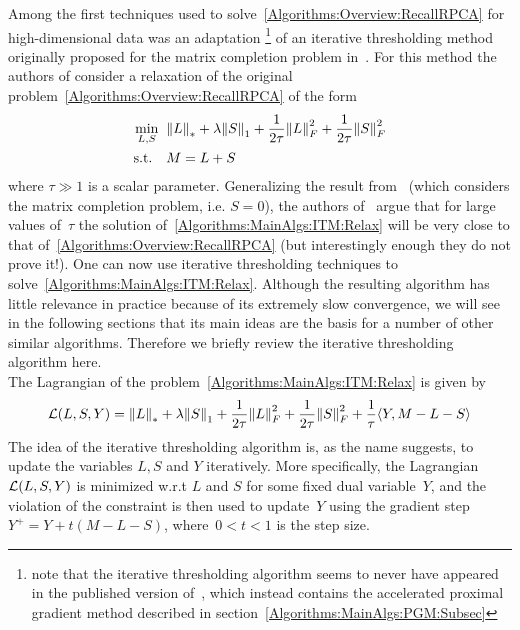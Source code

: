 \documentclass{../../common/projectreport}
\begin{document}
Among the first techniques used to solve~\eqref{Algorithms:Overview:RecallRPCA} for high-dimensional data was an adaptation \cite{Wright:2009fk}\footnote{note that the iterative thresholding algorithm seems to never have appeared in the published version of~\cite{Wright:2009fk}, which instead contains the accelerated proximal gradient method described in section~\ref{Algorithms:MainAlgs:PGM:Subsec}} of an iterative thresholding method originally proposed for the matrix completion problem in~\cite{Cai:2010uq}. For this method the authors of consider a relaxation of the original problem~\eqref{Algorithms:Overview:RecallRPCA} of the form 
%
\begin{align}
\begin{split}
\min_{L,S} \;\; &{\left\|L\right\|}_{*}^{} + \lambda {\left\|S\right\|}_{1}^{} + \frac{1}{2\tau} {\left\|L\right\|}_{F}^{2} + \frac{1}{2\tau} {\left\|S\right\|}_{F}^{2} \\
\text{s.t.} \quad &M=L+S
\end{split}
\label{Algorithms:MainAlgs:ITM:Relax}
\end{align}
%
where $\tau \gg 1$ is a scalar parameter. Generalizing the result from~\cite{Cai:2010uq} (which considers the matrix completion problem, i.e. $S=0$), the authors of~\cite{Wright:2009fk} argue that for large values of~$\tau$ the solution of~\eqref{Algorithms:MainAlgs:ITM:Relax} will be very close to that of~\eqref{Algorithms:Overview:RecallRPCA} (but interestingly enough they do not prove it!). One can now use iterative thresholding techniques to solve~\eqref{Algorithms:MainAlgs:ITM:Relax}. Although the resulting algorithm has little relevance in practice because of its extremely slow convergence, we will see in the following sections that its main ideas are the basis for a number of other similar algorithms. Therefore we briefly review the iterative thresholding algorithm here.\\ 

The Lagrangian of the problem~\eqref{Algorithms:MainAlgs:ITM:Relax} is given by
%
\begin{align}
{\mathcal{L}}(L,S,Y) = {\left\|L\right\|}_{*}^{} + \lambda {\left\|S\right\|}_{1}^{} + \frac{1}{2\tau} {\left\|L\right\|}_{F}^{2} + \frac{1}{2\tau} {\left\|S\right\|}_{F}^{2} + \frac{1}{\tau} \langle Y, M-L-S \rangle
\label{Algorithms:MainAlgs:ITM:Lagr}
\end{align}
%
The idea of the iterative thresholding algorithm is, as the name suggests, to update the variables $L,S$ and $Y$ iteratively. More specifically, the Lagrangian ${\mathcal{L}}(L,S,Y)$ is minimized w.r.t $L$ and $S$ for some fixed dual variable~$Y$, and the violation of the constraint is then used to update~$Y$ using the gradient step~$Y^+ = Y + t (M-L-S)$, where~$0<t<1$ is the step size.\\
\end{document}
